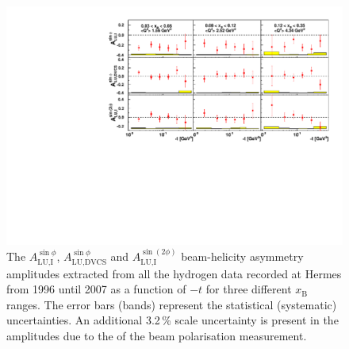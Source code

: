 \begin{figure}
 \begin{center}
 \includegraphics[width=15cm]{bsadvcsplots_tc_xbjrange_eml_par13_bin6_9607_pic_dual}
  \caption{The $A_{\textrm{LU,I}}^{\sin\phi}$, $A_{\textrm{LU,DVCS}}^{\sin\phi}$ and
$A_{\textrm{LU,I}}^{\sin(2\phi)}$ beam-helicity asymmetry amplitudes extracted from all the hydrogen data recorded at H{\sc ermes} from 1996 until 2007 as a function of $-t$ for three different $x_{\textrm{B}}$ ranges. The error bars (bands) represent the statistical (systematic) uncertainties. An additional 3.2\,\% scale uncertainty is present in the amplitudes due to the  of the beam polarisation measurement.}
  \label{bsa_xbjrange2}
 \end{center}
\end{figure}

